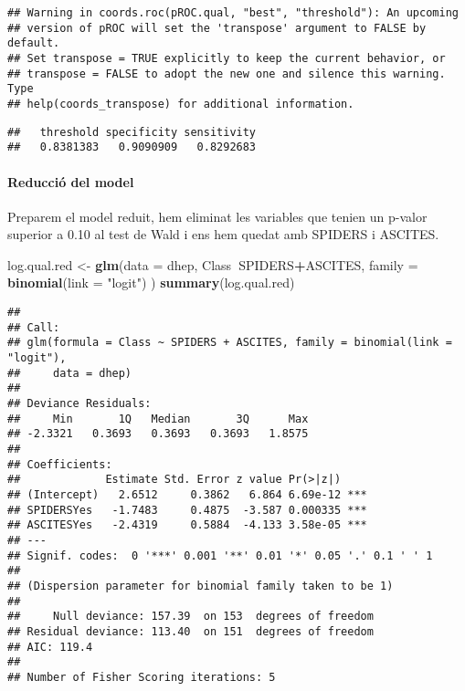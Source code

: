 \documentclass[]{article}
\newenvironment{Shaded}{\begin{snugshade}}{\end{snugshade}}
\newcommand{\DataTypeTok}[1]{\textcolor[rgb]{0.13,0.29,0.53}{#1}}
\newcommand{\KeywordTok}[1]{\textcolor[rgb]{0.13,0.29,0.53}{\textbf{#1}}}
\newcommand{\NormalTok}[1]{#1}
\newcommand{\OperatorTok}[1]{\textcolor[rgb]{0.81,0.36,0.00}{\textbf{#1}}}
\newcommand{\StringTok}[1]{\textcolor[rgb]{0.31,0.60,0.02}{#1}}
\let\oldparagraph\paragraph
\renewcommand{\paragraph}[1]{\oldparagraph{#1}\mbox{}}
\begin{document}
\begin{verbatim}
## Warning in coords.roc(pROC.qual, "best", "threshold"): An upcoming
## version of pROC will set the 'transpose' argument to FALSE by default.
## Set transpose = TRUE explicitly to keep the current behavior, or
## transpose = FALSE to adopt the new one and silence this warning. Type
## help(coords_transpose) for additional information.
\end{verbatim}

\begin{verbatim}
##   threshold specificity sensitivity 
##   0.8381383   0.9090909   0.8292683
\end{verbatim}

\hypertarget{reducciuxf3-del-model}{%
\paragraph{Reducció del model}\label{reducciuxf3-del-model}}

Preparem el model reduit, hem eliminat les variables que tenien un
p-valor superior a 0.10 al test de Wald i ens hem quedat amb SPIDERS i
ASCITES.

\begin{Shaded}
\begin{Highlighting}[]
\NormalTok{log.qual.red <-}\StringTok{ }\KeywordTok{glm}\NormalTok{(}\DataTypeTok{data =}\NormalTok{ dhep, Class}\OperatorTok{~}\NormalTok{SPIDERS}\OperatorTok{+}\NormalTok{ASCITES,}
                 \DataTypeTok{family =} \KeywordTok{binomial}\NormalTok{(}\DataTypeTok{link =} \StringTok{"logit"}\NormalTok{) )}
\KeywordTok{summary}\NormalTok{(log.qual.red)}
\end{Highlighting}
\end{Shaded}

\begin{verbatim}
## 
## Call:
## glm(formula = Class ~ SPIDERS + ASCITES, family = binomial(link = "logit"), 
##     data = dhep)
## 
## Deviance Residuals: 
##     Min       1Q   Median       3Q      Max  
## -2.3321   0.3693   0.3693   0.3693   1.8575  
## 
## Coefficients:
##             Estimate Std. Error z value Pr(>|z|)    
## (Intercept)   2.6512     0.3862   6.864 6.69e-12 ***
## SPIDERSYes   -1.7483     0.4875  -3.587 0.000335 ***
## ASCITESYes   -2.4319     0.5884  -4.133 3.58e-05 ***
## ---
## Signif. codes:  0 '***' 0.001 '**' 0.01 '*' 0.05 '.' 0.1 ' ' 1
## 
## (Dispersion parameter for binomial family taken to be 1)
## 
##     Null deviance: 157.39  on 153  degrees of freedom
## Residual deviance: 113.40  on 151  degrees of freedom
## AIC: 119.4
## 
## Number of Fisher Scoring iterations: 5
\end{verbatim}
\end{document}
